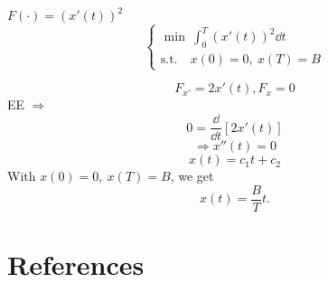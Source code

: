 \documentclass[twoside]{article}
\newcommand\imp{$\Longrightarrow$}
\begin{document}
\begin{example}
    $F(\cdot)=(x'(t))^2 $
    \begin{equation}
        \begin{cases}
            \min ~ \int_0^T (x'(t))^2 \dd t\\
            \text{s.t.} \quad x(0) = 0, ~ x(T) = B
        \end{cases}
    \end{equation}
\end{example}
\begin{equation}
    F_{x'} = 2x'(t), F_x = 0
\end{equation}
EE \imp \begin{equation}
    0 = \frac{\dd }{\dd t}[2x'(t)]
\end{equation}
\begin{equation}
    \Longrightarrow x''(t) = 0
\end{equation}
\begin{equation}
    x(t) = c_1 t + c_2
\end{equation}
With $x(0) = 0, ~ x(T) = B$, we get
\begin{equation}
    x(t) = \frac{B}{T}t.
\end{equation}































































\clearpage
\section*{References}

\end{document}
